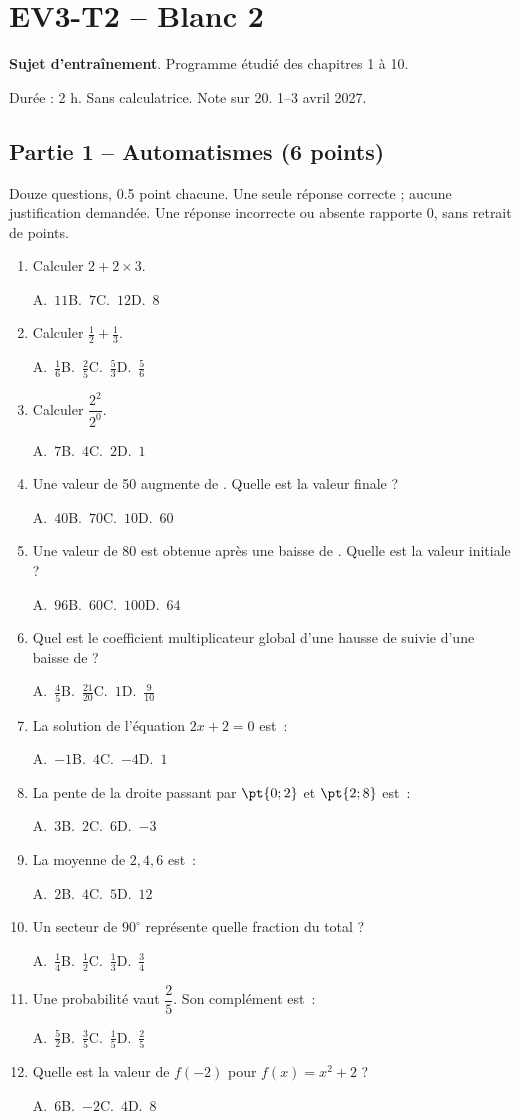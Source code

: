 \mxnewpage\section*{EV3-T2 -- Blanc 2}\label{EV3-T2}
\textbf{Sujet d’entraînement}. Programme étudié des chapitres 1 à 10.\par Durée : 2 h. Sans calculatrice. Note sur 20. 1–3 avril 2027.
\subsection*{Partie 1 -- Automatismes (6 points)}
Douze questions, \num{0,5} point chacune. Une seule réponse correcte ; aucune justification demandée. Une réponse incorrecte ou absente rapporte 0, sans retrait de points.
\begin{enumerate}
\item Calculer $2+2\times3$.\par A.~$11$\quad B.~$7$\quad C.~$12$\quad D.~$8$
\item Calculer $\frac12+\frac13$.\par A.~$\frac{1}{6}$\quad B.~$\frac{2}{5}$\quad C.~$\frac{5}{3}$\quad D.~$\frac{5}{6}$
\item Calculer $\dfrac{2^2}{2^{0}}$.\par A.~$7$\quad B.~$4$\quad C.~$2$\quad D.~$1$
\item Une valeur de 50 augmente de . Quelle est la valeur finale ?\par A.~$40$\quad B.~$70$\quad C.~$10$\quad D.~$60$
\item Une valeur de 80 est obtenue après une baisse de . Quelle est la valeur initiale ?\par A.~$96$\quad B.~$60$\quad C.~$100$\quad D.~$64$
\item Quel est le coefficient multiplicateur global d’une hausse de  suivie d’une baisse de  ?\par A.~$\frac{4}{5}$\quad B.~$\frac{21}{20}$\quad C.~$1$\quad D.~$\frac{9}{10}$
\item La solution de l’équation $2x+2=0$ est~:\par A.~$-1$\quad B.~$4$\quad C.~$-4$\quad D.~$1$
\item La pente de la droite passant par $\pt{0;2}$ et $\pt{2;8}$ est~:\par A.~$3$\quad B.~$2$\quad C.~$6$\quad D.~$-3$
\item La moyenne de $2, 4, 6$ est~:\par A.~$2$\quad B.~$4$\quad C.~$5$\quad D.~$12$
\item Un secteur de $90^\circ$ représente quelle fraction du total ?\par A.~$\frac{1}{4}$\quad B.~$\frac{1}{2}$\quad C.~$\frac{1}{3}$\quad D.~$\frac{3}{4}$
\item Une probabilité vaut $\dfrac{2}{5}$. Son complément est~:\par A.~$\frac{5}{2}$\quad B.~$\frac{3}{5}$\quad C.~$\frac{1}{5}$\quad D.~$\frac{2}{5}$
\item Quelle est la valeur de $f(-2)$ pour $f(x)=x^2+2$ ?\par A.~$6$\quad B.~$-2$\quad C.~$4$\quad D.~$8$
\end{enumerate}
